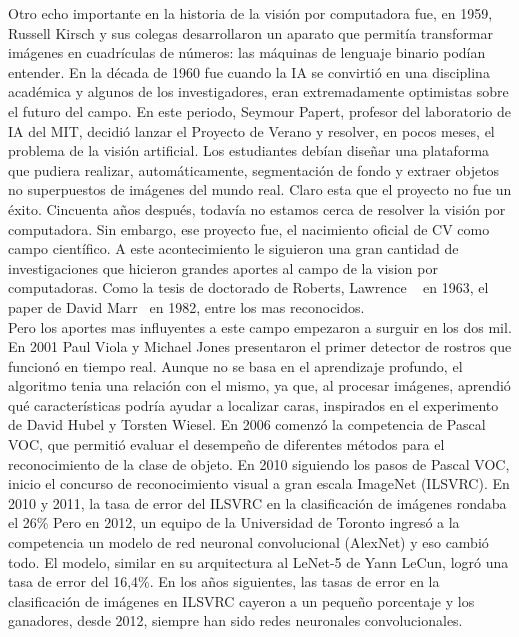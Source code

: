 Otro echo importante en la historia de la visión por computadora fue, en 1959, Russell Kirsch y sus colegas desarrollaron un aparato que permitía transformar imágenes en cuadrículas de números: las máquinas de lenguaje binario podían entender. En la década de 1960 fue cuando la IA se convirtió en una disciplina académica y algunos de los investigadores, eran extremadamente optimistas sobre el futuro del campo. En este periodo, Seymour Papert, profesor del laboratorio de IA del MIT, decidió lanzar el Proyecto de Verano y resolver, en pocos meses, el problema de la visión artificial. Los estudiantes debían diseñar una plataforma que pudiera realizar, automáticamente, segmentación de fondo y extraer objetos no superpuestos de imágenes del mundo real. Claro esta que el proyecto no fue un éxito. Cincuenta años después, todavía no estamos cerca de resolver la visión por computadora. Sin embargo, ese proyecto fue, el nacimiento oficial de CV como campo científico. A este acontecimiento le siguieron una gran cantidad de investigaciones que hicieron grandes aportes al campo de la vision por computadoras. Como la tesis de doctorado de Roberts, Lawrence ~\cite{roberts1963machine} en 1963, el paper de David Marr~\cite{vision_marr} en 1982, entre los mas reconocidos.\\
Pero los aportes mas influyentes a este campo empezaron a surguir en los dos mil.
En 2001 Paul Viola y Michael Jones presentaron el primer detector de rostros que funcionó en tiempo real. Aunque no se basa en el aprendizaje profundo, el algoritmo tenia una relación con el mismo, ya que, al procesar imágenes, aprendió qué características podría ayudar a localizar caras, inspirados en el experimento de David Hubel y Torsten Wiesel. En 2006 comenzó la competencia de Pascal VOC, que permitió evaluar el desempeño de diferentes métodos para el reconocimiento de la clase de objeto. En 2010 siguiendo los pasos de Pascal VOC, inicio el concurso de reconocimiento visual a gran escala ImageNet (ILSVRC). En 2010 y 2011, la tasa de error del ILSVRC en la clasificación de imágenes rondaba el 26\%  Pero en 2012, un equipo de la Universidad de Toronto ingresó a la competencia un modelo de red neuronal convolucional (AlexNet) y eso cambió todo. El modelo, similar en su arquitectura al LeNet-5 de Yann LeCun, logró una tasa de error del 16,4\%. En los años siguientes, las tasas de error en la clasificación de imágenes en ILSVRC cayeron a un pequeño porcentaje y los ganadores, desde 2012, siempre han sido redes neuronales convolucionales.

